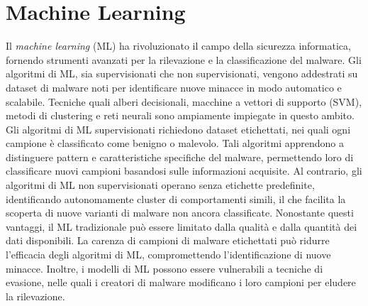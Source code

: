 \section{Machine Learning}
Il \emph{machine learning} (ML) ha rivoluzionato il campo della sicurezza informatica, fornendo strumenti avanzati per la rilevazione e la classificazione del malware. Gli algoritmi di ML, sia supervisionati che non supervisionati, vengono addestrati su dataset di malware noti per identificare nuove minacce in modo automatico e scalabile. Tecniche quali alberi decisionali, macchine a vettori di supporto (SVM), metodi di clustering e reti neurali sono ampiamente impiegate in questo ambito.
Gli algoritmi di ML supervisionati richiedono dataset etichettati, nei quali ogni campione è classificato come benigno o malevolo. Tali algoritmi apprendono a distinguere pattern e caratteristiche specifiche del malware, permettendo loro di classificare nuovi campioni basandosi sulle informazioni acquisite. Al contrario, gli algoritmi di ML non supervisionati operano senza etichette predefinite, identificando autonomamente cluster di comportamenti simili, il che facilita la scoperta di nuove varianti di malware non ancora classificate.
Nonostante questi vantaggi, il ML tradizionale può essere limitato dalla qualità e dalla quantità dei dati disponibili. La carenza di campioni di malware etichettati può ridurre l'efficacia degli algoritmi di ML, compromettendo l'identificazione di nuove minacce. Inoltre, i modelli di ML possono essere vulnerabili a tecniche di evasione, nelle quali i creatori di malware modificano i loro campioni per eludere la rilevazione.

